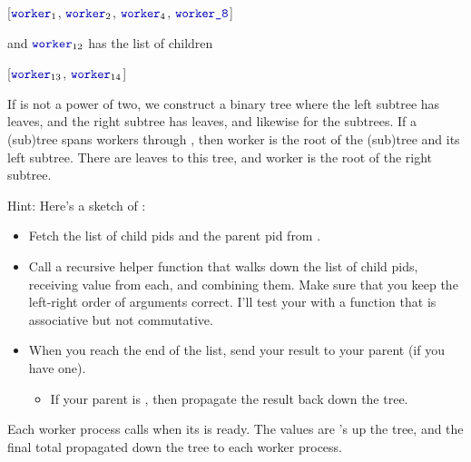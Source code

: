\documentclass{article}
\begin{document}
\begin{enumerate}
\begin{description}
\begin{SmallCode}
	  \rule{0em}{0ex}[$\code{worker}_1$, $\code{worker}_2$, $\code{worker}_4$, $\code{worker\_8}$]
	\end{SmallCode}
	and $\code{worker}_{12}$ has the list of children
	\begin{SmallCode}
	  \rule{0em}{0ex}[$\code{worker}_{13}$, $\code{worker}_{14}$]
	\end{SmallCode}
	If  is not a power of two, we construct a binary tree where the left subtree has  leaves,
	and the right subtree has  leaves, and likewise for the subtrees.  If a (sub)tree spans workers
	 through , then worker  is the root of the (sub)tree and its left subtree.  There
	are  leaves to this tree, and worker  is the root of the right subtree.
    \end{description}
    Hint: Here's a sketch of :
    \begin{itemize}
      \item Fetch the list of child pids and the parent pid from .
      \item Call a recursive helper function that walks down the list of child pids,
	receiving value from each, and combining them.  Make sure that you keep the
	left-right order of arguments correct.  I'll test your  with
	a  function that is associative but not commutative.
      \item When you reach the end of the list, send your result to your parent (if you have one).
	\begin{itemize}
	  \item If your parent is , then propagate the result back down the tree.
	\end{itemize}
    \end{itemize}
    Each worker process calls  when its  is ready.
    The values are 's up the tree, and the final total propagated down the tree to each worker process.


\end{enumerate}
\end{document}
